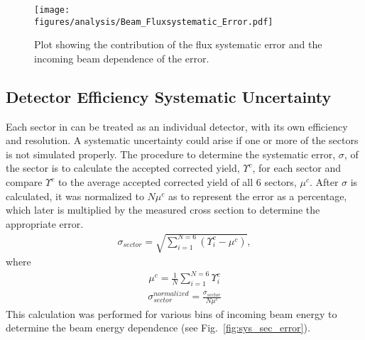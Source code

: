 \begin{figure}[h!]\begin{center}
\texttt{[image: \\figures/analysis/Beam\_Fluxsystematic\_Error.pdf]}
\caption[Plot showing the contribution of the flux systematic error and the incoming beam dependence of the error]{\label{fig:sys_flux_error} Plot showing the contribution of the flux systematic error and the incoming beam dependence of the error.}
\end{center}\end{figure}
\FloatBarrier


 
\subsection{Detector Efficiency Systematic Uncertainty}
Each sector in  can be treated as an individual detector, with its own efficiency and resolution. A systematic uncertainty could arise if one or more of the sectors is not simulated properly. The procedure to determine the systematic error, $\sigma$, of the sector is to calculate the accepted corrected yield, $\Upsilon^c$, for each sector and compare $\Upsilon^c$ to the average accepted corrected yield of all 6 sectors, $\mu^c$. After $\sigma$ is calculated, it was normalized to $N \mu^c$ as to represent the error as a percentage, which later is multiplied by the measured cross section to determine the appropriate error. 
\begin{align}
\sigma_{sector} = \sqrt{\sum_{i=1}^{N = 6}\left(\Upsilon_i^c - \mu^c\right)},
\end{align}
where
\begin{align}
\mu^c = \frac{1}{N}\sum_{i=1}^{N=6}\Upsilon_i^c
\end{align}
\begin{align}
\sigma_{sector}^{normalized} = \frac{\sigma_{sector}}{N\mu^c}
\end{align}
This calculation was performed for various bins of incoming beam energy to determine the beam energy dependence (see Fig.~\ref{fig:sys_sec_error}).


